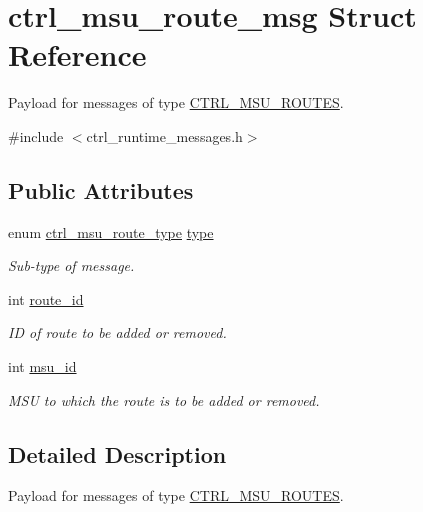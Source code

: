 \hypertarget{structctrl__msu__route__msg}{\section{ctrl\-\_\-msu\-\_\-route\-\_\-msg Struct Reference}
\label{structctrl__msu__route__msg}
}


Payload for messages of type \hyperlink{ctrl__runtime__messages_8h_aff250b7918a6975b13277c84bc6ec5b9a2a0142e4dd46b965c0cd6e97b51c30d4}{C\-T\-R\-L\-\_\-\-M\-S\-U\-\_\-\-R\-O\-U\-T\-E\-S}.  




{\ttfamily \#include $<$ctrl\-\_\-runtime\-\_\-messages.\-h$>$}

\subsection*{Public Attributes}
\begin{DoxyCompactItemize}
\item 
enum \hyperlink{ctrl__runtime__messages_8h_aa8b79c4e41165b9ea65d306ce7550fa7}{ctrl\-\_\-msu\-\_\-route\-\_\-type} \hyperlink{structctrl__msu__route__msg_aab44678aabd93699f6fc6c3ac4342761}{type}
\begin{DoxyCompactList}\small\item\em Sub-\/type of message. \end{DoxyCompactList}\item 
int \hyperlink{structctrl__msu__route__msg_a932e1789c351a3f9fc12686510097b5f}{route\-\_\-id}
\begin{DoxyCompactList}\small\item\em I\-D of route to be added or removed. \end{DoxyCompactList}\item 
int \hyperlink{structctrl__msu__route__msg_a4e29c9a68472bf6c53a719e3c4eb20ca}{msu\-\_\-id}
\begin{DoxyCompactList}\small\item\em M\-S\-U to which the route is to be added or removed. \end{DoxyCompactList}\end{DoxyCompactItemize}


\subsection{Detailed Description}
Payload for messages of type \hyperlink{ctrl__runtime__messages_8h_aff250b7918a6975b13277c84bc6ec5b9a2a0142e4dd46b965c0cd6e97b51c30d4}{C\-T\-R\-L\-\_\-\-M\-S\-U\-\_\-\-R\-O\-U\-T\-E\-S}. 

